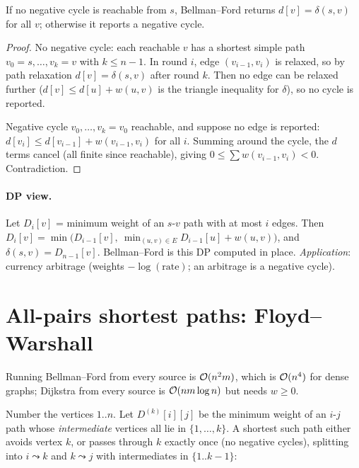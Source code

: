 \begin{theorem}
If no negative cycle is reachable from $s$, Bellman--Ford returns $d[v]=\delta(s,v)$ for all $v$; otherwise it reports a negative cycle.
\end{theorem}
\begin{proof}
No negative cycle: each reachable $v$ has a shortest simple path $v_0=s,\dots,v_k=v$ with $k\le n-1$. In round $i$, edge $(v_{i-1},v_i)$ is relaxed, so by path
relaxation $d[v]=\delta(s,v)$ after round $k$. Then no edge can be relaxed further ($d[v]\le d[u]+w(u,v)$ is the triangle inequality for $\delta$), so no cycle is reported.

Negative cycle $v_0,\dots,v_k=v_0$ reachable, and suppose no edge is reported: $d[v_i]\le d[v_{i-1}]+w(v_{i-1},v_i)$ for all $i$. Summing around the cycle,
the $d$ terms cancel (all finite since reachable), giving $0\le\sum w(v_{i-1},v_i)<0$. Contradiction.
\end{proof}

\paragraph{DP view.} Let $D_i[v]$ = minimum weight of an $s$-$v$ path with at most $i$ edges. Then
$D_i[v]=\min\bigl(D_{i-1}[v],\ \min_{(u,v)\in E}D_{i-1}[u]+w(u,v)\bigr)$, and $\delta(s,v)=D_{n-1}[v]$. Bellman--Ford is this DP computed in place.
\emph{Application}: currency arbitrage (weights $-\log(\text{rate})$; an arbitrage is a negative cycle).

\section{All-pairs shortest paths: Floyd--Warshall}
Running Bellman--Ford from every source is $\mathcal{O}(n^2m)$, which is $\mathcal{O}(n^4)$ for dense graphs; Dijkstra from every source is $\mathcal{O}(nm\log n)$ but needs $w\ge0$.

Number the vertices $1..n$. Let $D^{(k)}[i][j]$ be the minimum weight of an $i$-$j$ path whose \emph{intermediate} vertices all lie in $\{1,\dots,k\}$.
A shortest such path either avoids vertex $k$, or passes through $k$ exactly once (no negative cycles), splitting into $i\leadsto k$ and $k\leadsto j$ with intermediates in $\{1..k-1\}$:

